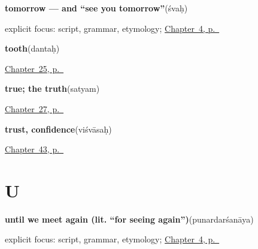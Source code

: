 \noindent\begin{minipage}[t]{\linewidth}
\raggedright
\textbf{tomorrow — and \textquotedblleft{}see you tomorrow\textquotedblright{}}\enspace\emph{}\enspace(śvaḥ)\par
\footnotesize explicit focus: script, grammar, etymology; \hyperref[ch:farewells]{Chapter~4, p.~\pageref*{ch:farewells}}
\end{minipage}\par\smallskip

\noindent\begin{minipage}[t]{\linewidth}
\raggedright
\textbf{tooth}\enspace\emph{}\enspace(dantaḥ)\par
\footnotesize \hyperref[ch:sa-body-more]{Chapter~25, p.~\pageref*{ch:sa-body-more}}
\end{minipage}\par\smallskip

\noindent\begin{minipage}[t]{\linewidth}
\raggedright
\textbf{true; the truth}\enspace\emph{}\enspace(satyam)\par
\footnotesize \hyperref[ch:sa-replies]{Chapter~27, p.~\pageref*{ch:sa-replies}}
\end{minipage}\par\smallskip

\noindent\begin{minipage}[t]{\linewidth}
\raggedright
\textbf{trust, confidence}\enspace\emph{}\enspace(viśvāsaḥ)\par
\footnotesize \hyperref[ch:sa-good-manners]{Chapter~43, p.~\pageref*{ch:sa-good-manners}}
\end{minipage}\par\smallskip

\section*{U}

\noindent\begin{minipage}[t]{\linewidth}
\raggedright
\textbf{until we meet again (lit. \textquotedblleft{}for seeing again\textquotedblright{})}\enspace\emph{}\enspace(punardarśanāya)\par
\footnotesize explicit focus: script, grammar, etymology; \hyperref[ch:farewells]{Chapter~4, p.~\pageref*{ch:farewells}}
\end{minipage}\par\smallskip

